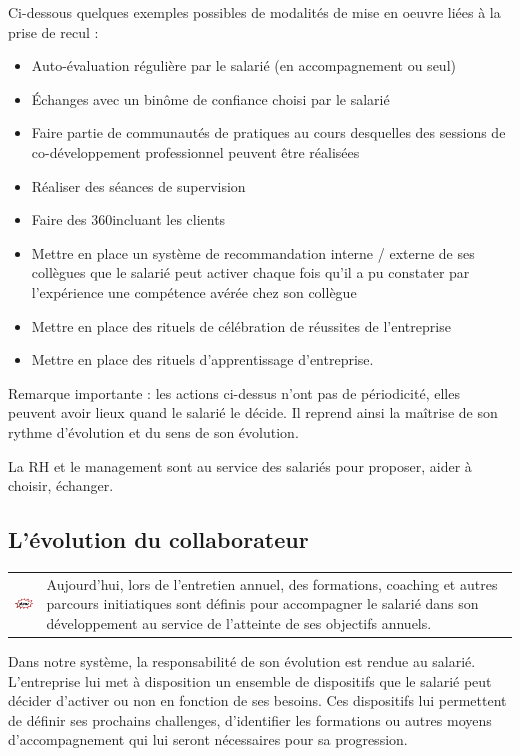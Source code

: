 \documentclass[12pt]{article}
\newcommand{\actuel}[1]{%
  \begin{tcolorbox}[colframe=DarkButter,boxrule=2pt,arc=4pt,left=6pt,right=6pt,top=6pt,bottom=6pt,boxsep=0pt,colback=Aluminium1]
    \begin{tabular}{m{1.5cm} m{11cm}}
      \includegraphics[width=1.5cm]{includes/now} & #1 \\
    \end{tabular}
  \end{tcolorbox}
}
\begin{document}
 Ci-dessous quelques exemples possibles de modalités de mise en oeuvre liées à la prise de recul :
 \begin{itemize}
   \item Auto-évaluation régulière par le salarié (en accompagnement ou seul)
   \item Échanges avec un binôme de confiance choisi par le salarié
   \item Faire partie de communautés de pratiques au cours desquelles des sessions de co-développement professionnel peuvent être réalisées
   \item Réaliser des séances de supervision
   \item Faire des 360\degre incluant les clients
   \item Mettre en place un système de recommandation interne / externe de ses collègues que le salarié peut activer chaque fois qu’il a pu constater par l’expérience une compétence avérée chez son collègue
   \item Mettre en place des rituels de célébration de réussites de l’entreprise
   \item Mettre en place des rituels d’apprentissage d’entreprise.
 \end{itemize}

 Remarque importante : les actions ci-dessus n’ont pas de périodicité, elles peuvent avoir lieux quand le salarié le décide. Il reprend ainsi la maîtrise de son rythme d’évolution et du sens de son évolution.

 La RH et le management sont au service des salariés pour proposer, aider à choisir, échanger. 

\subsection{L’évolution du collaborateur}
 \actuel{Aujourd’hui, lors de l’entretien annuel, des formations, coaching et autres parcours initiatiques sont définis pour accompagner le salarié dans son développement au service de l’atteinte de ses objectifs annuels.}

 Dans notre système, la responsabilité de son évolution est rendue au salarié. L’entreprise lui met à disposition un ensemble de dispositifs que le salarié peut décider d’activer ou non en fonction de ses besoins. Ces dispositifs lui permettent de définir ses prochains challenges, d’identifier les formations ou autres moyens d'accompagnement qui lui seront nécessaires pour sa progression.
\end{document}
